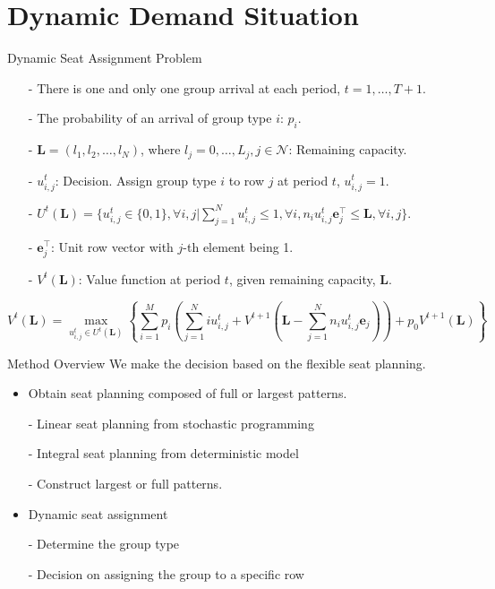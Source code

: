 
\section{Dynamic Demand Situation}
    \frame{\sectionpage}

    \begin{frame}{Dynamic Seat Assignment Problem}
      \centering
      \small
      \begin{itemize}
      \item[-] There is one and only one group arrival at each period, $t = 1, \ldots, T+1$. 
      \item[-] The probability of an arrival of group type $i$: $p_i$.  
      \item[-] $\mathbf{L} = (l_1, l_2, \ldots, l_{N})$, where $l_j =0,\ldots, L_j, j\in \mathcal{N}$: Remaining capacity.
      \item[-] $u_{i,j}^{t}$: Decision. Assign group type $i$ to row $j$ at period $t$, $u_{i,j}^t =1$.
      \item[-] $U^{t}(\mathbf{L}) = \{u_{i,j}^{t} \in\{0,1\}, \forall i,j| \sum_{j=1}^{N} u_{i,j}^{t} \leq 1, \forall i, n_{i}u_{i,j}^{t}\mathbf{e}_j^{\top} \leq \mathbf{L}, \forall i,j \}$.
      \item[-] $\mathbf{e}_j^{\top}$: Unit row vector with $j$-th element being 1.
      \item[-] $V^{t}(\mathbf{L})$: Value function at period $t$, given remaining capacity, $\mathbf{L}$.
      \end{itemize}
  
      $$V^{t}(\mathbf{L}) = \max_{u_{i,j}^{t} \in U^{t}(\mathbf{L})}\left\{ \sum_{i=1}^{M} p_i ( \sum_{j=1}^{N} i u_{i,j}^{t} + V^{t+1}(\mathbf{L}- \sum_{j=1}^{N} n_i u_{i,j}^{t}\mathbf{e}_j)) + p_0 V^{t+1}(\mathbf{L})\right\}$$
      \small
  \end{frame}

  \begin{frame}{Method Overview}
    We make the decision based on the flexible seat planning.
    \begin{itemize}
      \item Obtain seat planning composed of full or largest patterns.
      
      - Linear seat planning from stochastic programming
      
      - Integral seat planning from deterministic model
  
      - Construct largest or full patterns.
  
      \item Dynamic seat assignment
  
      - Determine the group type
  
      - Decision on assigning the group to a specific row

    \end{itemize}
  \end{frame}
    
